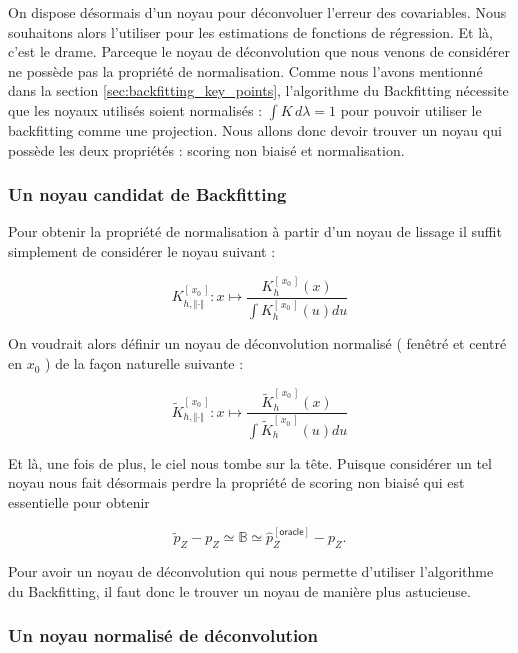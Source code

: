 On dispose désormais d'un noyau pour déconvoluer l'erreur des covariables. Nous souhaitons alors l'utiliser pour les estimations de fonctions de régression. Et là, c'est le drame. Parceque le noyau de déconvolution que nous venons de considérer ne possède pas la propriété de normalisation. Comme nous l'avons mentionné dans la section \ref{sec:backfitting_key_points}, l'algorithme du Backfitting nécessite que les noyaux utilisés soient normalisés : $\int K \, d\lambda= 1$ pour pouvoir utiliser le backfitting comme une projection. Nous allons donc devoir trouver un noyau qui possède les deux propriétés : scoring non biaisé et normalisation.

\subsubsection{Un noyau candidat de Backfitting}

Pour obtenir la propriété de normalisation à partir d'un noyau de lissage il suffit simplement de considérer le noyau suivant :

\begin{equation}
    K_{h, \Vert \cdot \Vert}^{[\,x_0\,]} : x \mapsto \frac{K_h^{[\,x_0\,]}(x)}{\int K_h^{[\,x_0\,]}(u) du}
\end{equation}

\noindent On voudrait alors définir un noyau de déconvolution normalisé ( fenêtré et centré en $x_0$ ) de la façon naturelle suivante :

\begin{equation}
    \tilde K_{h, \Vert \cdot \Vert}^{[\,x_0\,]} : x \mapsto \frac{\tilde K^{[\,x_0\,]}_h(x)}{\int \tilde K^{[\,x_0\,]}_h(u) du}
\end{equation}

\faBomb Et là, une fois de plus, le ciel nous tombe sur la tête. Puisque considérer un tel noyau nous fait désormais perdre la propriété de scoring non biaisé qui est essentielle pour obtenir 

\begin{equation*}
    \tilde p_Z - p_Z \simeq \mathds B \simeq \hat p_Z^{[\textsf{oracle}]} - p_Z.
\end{equation*}

Pour avoir un noyau de déconvolution qui nous permette d'utiliser l'algorithme du Backfitting, il faut donc le trouver un noyau de manière plus astucieuse.

\subsubsection{Un noyau normalisé de déconvolution}


